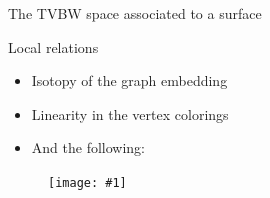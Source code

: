 \documentclass[final,t, mathserif]{beamer}
\newcommand{\ph}{\varphi}
\newcommand{\ee}{\mathbf{e}}
\DeclareMathOperator{\Obj}{Obj}
\DeclareMathOperator{\Hom}{Hom}
\newcommand{\img}[1]{
\vfill
\centering
\texttt{[image: \#1]}
\vfill}
\theoremstyle{plain}
\theoremstyle{definition}
\begin{document}
\begin{frame}{}
\begin{columns}[t]
\begin{column}{.3\linewidth}
\begin{block}{The TVBW space associated to a surface}
\begin{itemize}
  \end{itemize}

\end{block}





\begin{block}{Local relations}
\begin{itemize}
\item Isotopy of the graph embedding
\item Linearity in the vertex colorings
\item And the following:
\end{itemize}
\begin{figure}
  \img{local}
\end{figure}

\end{block}



\end{column}
\end{columns}
\end{frame}
\end{document}
